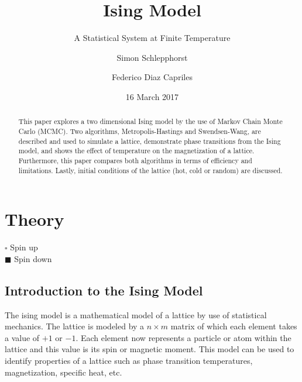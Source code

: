 \documentclass[a4]{scrartcl}
\begin{document}
\author{Simon Schlepphorst \and Federico Diaz Capriles}
\title{Ising Model}
\subtitle{A Statistical System at Finite Temperature}
\date{16 March 2017}

\maketitle

\begin{abstract}
This paper explores a two dimensional Ising model by the use of Markov Chain Monte Carlo (MCMC). Two algorithms, Metropolis-Hastings and Swendsen-Wang, are described and used to simulate a lattice, demonstrate phase transitions from the Ising model, and shows the effect of temperature on the magnetization of a lattice. Furthermore, this paper compares both algorithms in terms of efficiency and limitations. Lastly, initial conditions of the lattice (hot, cold or random) are discussed.
\end{abstract}

\tableofcontents

\section{Theory}

	\begin{minipage}{.6\textwidth}
			\begin{center}
		\end{center}
	\end{minipage}%
	\begin{minipage}[]{.4\textwidth}
		$ \square $ Spin up \\ 
		$ \blacksquare $ Spin down 
	\end{minipage}


\subsection{Introduction to the Ising Model}
The ising model is a mathematical model of a lattice by use of statistical mechanics. The lattice is modeled by a  $ n \times m $ matrix of which each element takes a value of $+1$ or $-1$. Each element now represents a particle or atom within the lattice and this value is its spin or magnetic moment. This model can be used to identify properties of a lattice such as phase transition temperatures, magnetization, specific heat, etc. 
\end{document}
